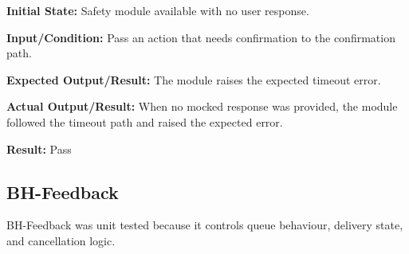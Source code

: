 \documentclass[12pt]{article}
\begin{document}
\begin{enumerate}
    \textbf{Initial State:} Safety module available with no user
    response.
    
    \textbf{Input/Condition:} Pass an action that needs confirmation
    to the confirmation path.
    
    \textbf{Expected Output/Result:} The module raises the expected
    timeout error.
    
    \textbf{Actual Output/Result:} When no mocked response was
    provided, the module followed the timeout path and raised the
    expected error.
    
    \textbf{Result:} Pass
\end{enumerate}

\subsection{BH-Feedback}

BH-Feedback was unit tested because it controls queue behaviour,
delivery state, and cancellation logic.
\end{document}
